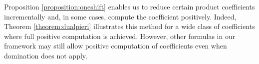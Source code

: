 \documentclass{amsart}
\theoremstyle{definition}
\newtheorem{example}[lemma]{Example}
\theoremstyle{remark}
\numberwithin{equation}{subsection}
\newcommand{\cperm}[1]{\llbracket #1\rrbracket}
\newcommand{\shifthom}{\tau}
\newcommand{\shiftvby}[1]{\shifthom^{#1}}
\begin{document}
Proposition \ref{proposition:oneshift} enables us to reduce certain product coefficients incrementally and, in some cases, compute the coefficient positively. Indeed, Theorem \ref{theorem:dualpieri} illustrates this method for a wide class of coefficients where full positive computation is achieved. However, other formulas in our framework may still allow positive computation of coefficients even when domination does not apply.

\end{document}
